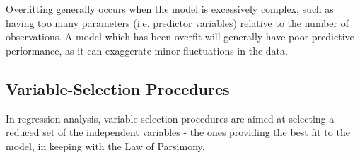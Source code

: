 \documentclass[a4paper,12pt]{article}
\begin{document}
Overfitting generally occurs when the model is excessively complex, such as having too many parameters (i.e. predictor variables) relative to the number of observations. A model which has been overfit will generally have poor predictive performance, as it can exaggerate minor fluctuations in the data.


\subsection{Variable-Selection Procedures}

In regression analysis, variable-selection procedures are aimed at selecting a reduced set of the independent variables - the ones providing the best fit to the model, in keeping with the Law of Parsimony.
\end{document}
